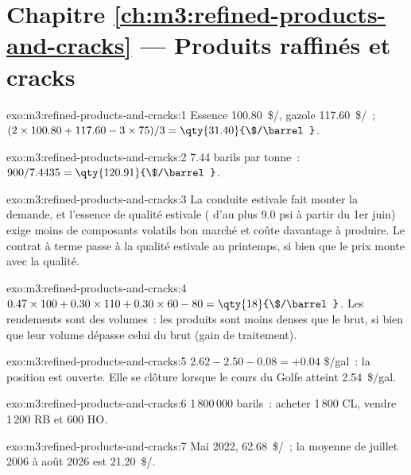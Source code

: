 \section*{Chapitre \ref{ch:m3:refined-products-and-cracks} --- Produits raffinés et cracks}

\begin{solution}{exo:m3:refined-products-and-cracks:1}
Essence \qty{100.80}{\$/\barrel}, gazole \qty{117.60}{\$/\barrel}~; $(2 \times 100.80 +
117.60 - 3 \times 75)/3 = \qty{31.40}{\$/\barrel}$.
\end{solution}

\begin{solution}{exo:m3:refined-products-and-cracks:2}
7.44 barils par tonne~: $900/7.4435 = \qty{120.91}{\$/\barrel}$.
\end{solution}

\begin{solution}{exo:m3:refined-products-and-cracks:3}
La conduite estivale fait monter la demande, et l'essence de qualité estivale ( d'au plus 9.0 psi à partir du 1er
juin) exige moins de composants volatils bon marché et coûte davantage à produire. Le contrat à terme
passe à la qualité estivale au printemps, si bien que le prix monte avec la qualité.
\end{solution}

\begin{solution}{exo:m3:refined-products-and-cracks:4}
$0.47 \times 100 + 0.30 \times 110 + 0.30 \times 60 - 80 = \qty{18}{\$/\barrel}$. Les
rendements sont des volumes~: les produits sont moins denses que le brut, si bien que leur volume dépasse
celui du brut (gain de traitement).
\end{solution}

\begin{solution}{exo:m3:refined-products-and-cracks:5}
$2.62 - 2.50 - 0.08 = +0.04$ \$/gal~: la position est ouverte. Elle se clôture lorsque le cours du Golfe atteint
\qty{2.54}{\$/gal}.
\end{solution}

\begin{solution}{exo:m3:refined-products-and-cracks:6}
1\,800\,000 barils~: acheter 1\,800 CL, vendre 1\,200 RB et 600 HO.
\end{solution}

\begin{solution}{exo:m3:refined-products-and-cracks:7}
Mai 2022, \qty{62.68}{\$/\barrel}~; la moyenne de juillet 2006 à août 2026 est
\qty{21.20}{\$/\barrel}.
\end{solution}

